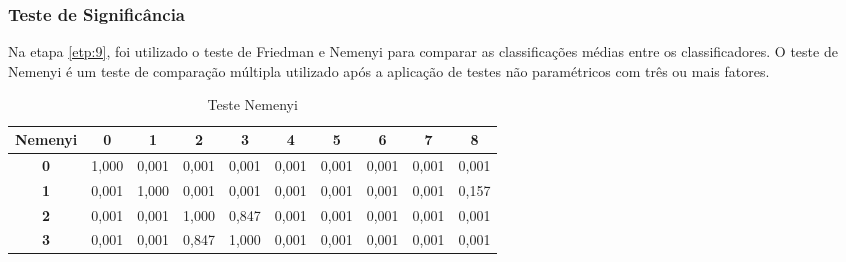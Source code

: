 \subsubsection{Teste de Signific\^ancia}

Na etapa \ref{etp:9}, foi utilizado o teste de Friedman e Nemenyi para comparar as classificações médias entre os classificadores. O teste de Nemenyi é um teste de comparação múltipla utilizado após a aplicação de testes não paramétricos com três ou mais fatores.

\begin{table}[H]
	\centering
	\caption{Teste Nemenyi}
	\begin{tabular}{@{}clllllllll@{}}
		\toprule
		\multicolumn{1}{l}{\textbf{Nemenyi}} & \multicolumn{1}{c}{\textbf{0}} & \multicolumn{1}{c}{\textbf{1}} & \multicolumn{1}{c}{\textbf{2}} & \multicolumn{1}{c}{\textbf{3}} & \multicolumn{1}{c}{\textbf{4}} & \multicolumn{1}{c}{\textbf{5}} & \multicolumn{1}{c}{\textbf{6}} & \multicolumn{1}{c}{\textbf{7}} & \multicolumn{1}{c}{\textbf{8}} \\ \midrule
		\textbf{0}                           & 1,000                          & 0,001                          & 0,001                          & 0,001                          & 0,001                          & 0,001                          & 0,001                          & 0,001                          & 0,001                          \\
		\textbf{1}                           & 0,001                          & 1,000                          & 0,001                          & 0,001                          & 0,001                          & 0,001                          & 0,001                          & 0,001                          & 0,157                          \\
		\textbf{2}                           & 0,001                          & 0,001                          & 1,000                          & 0,847                          & 0,001                          & 0,001                          & 0,001                          & 0,001                          & 0,001                          \\
		\textbf{3}                           & 0,001                          & 0,001                          & 0,847                          & 1,000                          & 0,001                          & 0,001                          & 0,001                          & 0,001                          & 0,001                          \\

\end{tabular}
\end{table}
